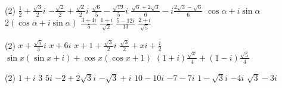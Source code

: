 \documentclass[12pt,a4paper]{article}
\begin{document}
\begin{exercise}
    \begin{tasks}(2)
        \task $\displaystyle \frac12+\frac{\sqrt3}{2}i$
        \task $\displaystyle -\frac{\sqrt2}{2}+\frac{\sqrt2}{2}i$
        \task $\displaystyle \frac{\sqrt6}{5}-\frac{\sqrt{19}}5i$
        \task $\displaystyle \frac{\sqrt6+2\sqrt3}{6}-i\frac{2\sqrt3-\sqrt6}{6}$
        \task $\cos\alpha+i\sin\alpha$
        \task $2(\cos\alpha+i\sin\alpha)$
        \task $\displaystyle \frac{3+4i}{5}$
        \task $\displaystyle \frac{1+i}{\sqrt2}$
        \task $\displaystyle \frac{5-12i}{13}$
        \task $\displaystyle \frac{2+i}{\sqrt5}$
    \end{tasks}
\end{exercise}


\begin{exercise}
        \begin{tasks}(2)
            \task $\displaystyle x+\frac{\sqrt5}{3}i$
            \task $x+6i$
            \task $\displaystyle x+1+\frac{\sqrt3}{2}i$
            \task $\displaystyle \frac{\sqrt3}{2}+xi+\frac{i}{2}$
            \task $\sin x(\sin x+i)+\cos x(\cos x+1)$
            \task $\displaystyle (1+i)\frac{\sqrt x}{4}+(1-i)\frac{\sqrt5}{4}$
        \end{tasks}
\end{exercise}





\setcounter{section}{3}

\begin{exercise}
    \begin{tasks}(2)
        \task $1+i$
        \task $3$
        \task $5i$
        \task $-2+2\sqrt3 i$
        \task $-\sqrt3+i$
        \task $10-10i$
        \task $-7-7i$
        \task $1-\sqrt3 i$
        \task $-4i$
        \task $\sqrt3-3i$
    \end{tasks}
\end{exercise}
\end{document}
